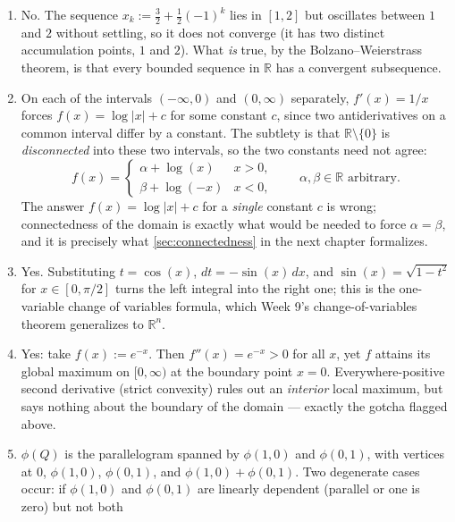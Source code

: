 \begin{exercisesolution}
\begin{enumerate}[label=\textbf{\arabic*.}]
  \item No. The sequence $x_k := \tfrac{3}{2} + \tfrac{1}{2}(-1)^k$ lies in $[1,2]$ but
    oscillates between $1$ and $2$ without settling, so it does not converge (it has two distinct
    accumulation points, $1$ and $2$). What \emph{is} true, by the Bolzano--Weierstrass theorem, is
    that every bounded sequence in $\mathbb{R}$ has a convergent subsequence.
  \item On each of the intervals $(-\infty,0)$ and $(0,\infty)$ separately, $f'(x) = 1/x$ forces
    $f(x) = \log|x| + c$ for some constant $c$, since two antiderivatives on a common interval
    differ by a constant. The subtlety is that $\mathbb{R}\setminus\{0\}$ is \emph{disconnected}
    into these two intervals, so the two constants need not agree:
    \[
      f(x) =
      \begin{cases}
        \alpha + \log(x) & x > 0, \\
        \beta + \log(-x) & x < 0,
      \end{cases}
      \qquad \alpha, \beta \in \mathbb{R} \text{ arbitrary}.
    \]
    The answer $f(x) = \log|x| + c$ for a \emph{single} constant $c$ is wrong; connectedness of
    the domain is exactly what would be needed to force $\alpha = \beta$, and it is precisely
    what \cref{sec:connectedness} in the next chapter formalizes.
  \item Yes. Substituting $t = \cos(x)$, $dt = -\sin(x)\,dx$, and $\sin(x) = \sqrt{1-t^2}$ for
    $x \in [0,\pi/2]$ turns the left integral into the right one; this is the one-variable change
    of variables formula, which Week 9's change-of-variables theorem generalizes to
    $\mathbb{R}^n$.
  \item Yes: take $f(x) := e^{-x}$. Then $f''(x) = e^{-x} > 0$ for all $x$, yet $f$ attains its
    global maximum on $[0,\infty)$ at the boundary point $x=0$. Everywhere-positive second
    derivative (strict convexity) rules out an \emph{interior} local maximum, but says nothing
    about the boundary of the domain --- exactly the gotcha flagged above.
  \item $\phi(Q)$ is the parallelogram spanned by $\phi(1,0)$ and $\phi(0,1)$, with vertices at
    $0$, $\phi(1,0)$, $\phi(0,1)$, and $\phi(1,0)+\phi(0,1)$. Two degenerate cases occur: if
    $\phi(1,0)$ and $\phi(0,1)$ are linearly dependent (parallel or one is zero) but not both

\end{enumerate}
\end{exercisesolution}
